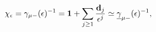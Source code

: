 \begin{equation}
\chi_{\epsilon}=\gamma_{\mu -}(\epsilon)^{-1}={\bf 1}+\sum_{j\geq 1}\frac{{\bf d}_{j}}{\epsilon^{j}}\simeq {\underline \gamma}_{\mu -}(\epsilon)^{-1},\label{z.3}
\end{equation}

